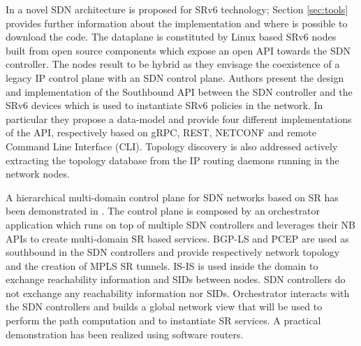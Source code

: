 In \cite{ventre2018sdn} a novel SDN architecture is proposed for SRv6 technology; Section \ref{sec:tools} provides further information about the implementation and where is possible to download the code. The dataplane is constituted by Linux based SRv6 nodes built from open source components which expose an open API towards the SDN controller. The nodes result to be hybrid as they envisage the coexistence of a legacy IP control plane with an SDN control plane. Authors present the design and implementation of the Southbound API between the SDN controller and the SRv6 devices which is used to instantiate SRv6 policies in the network. In particular they propose a data-model and provide four different implementations of the API, respectively based on gRPC, REST, NETCONF and remote Command Line Interface (CLI). Topology discovery is also addressed actively extracting the topology database from the IP routing daemons running in the network nodes. %

A hierarchical multi-domain control plane for SDN networks based on SR has been demonstrated in \cite{demonstrationofsr}. The control plane is composed by an orchestrator application which runs on top of multiple SDN controllers and leverages their NB APIs to create multi-domain SR based services. BGP-LS and PCEP are used as southbound in the SDN controllers and provide respectively network topology and the creation of MPLS SR tunnels. IS-IS is used inside the domain to exchange reachability information and SIDs between nodes. SDN controllers do not exchange any reachability information nor SIDs. Orchestrator interacts with the SDN controllers and builds a global network view that will be used to perform the path computation and to instantiate SR services. A practical demonstration has been realized using software routers. 

